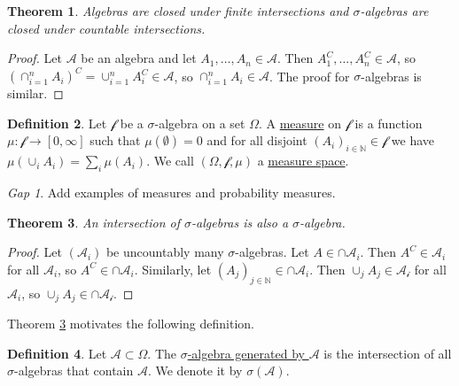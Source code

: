 \documentclass[11pt]{article}
\newcommand{\col}[1]{\mathscr{#1}}
\newcommand{\defname}[1]{\underline{#1}}
\newcommand{\NN}{\mathbb{N}}
\theoremstyle{theorem}
\newtheorem{theorem}{Theorem}[section]
\theoremstyle{definition}
\newtheorem{definition}[theorem]{Definition}
\theoremstyle{remark}
\theoremstyle{step}
\theoremstyle{gap}
\newtheorem*{gap}{Gap}
\begin{document}
\begin{theorem}
Algebras are closed under finite intersections and \(\sigma\)-algebras are closed under countable intersections.
\end{theorem}

\begin{proof}
Let \(\col{A}\) be an algebra and let \(A_1, \ldots, A_n \in \col{A}\). Then \(A_1^C, \ldots, A_n^C \in \col{A}\), so \(\left(\cap_{i=1}^n A_i\right)^C = \cup_{i=1}^n A_i^C \in \col{A}\), so \(\cap_{i=1}^n A_i \in \col{A}\). The proof for \(\sigma\)-algebras is similar.
\end{proof}

\begin{definition}
Let \(\col{f}\) be a \(\sigma\)-algebra on a set \(\Omega\). A \defname{measure} on \(\col{f}\) is a function \(\mu:\col{f} \to [0, \infty]\) such that \(\mu(\emptyset) = 0\) and for all disjoint \(\left(A_i\right)_{i\in \NN} \in \col{f}\) we have \(\mu\left(\cup_i A_i\right) = \sum_i \mu\left(A_i\right)\). We call \((\Omega, \col{f}, \mu)\) a \defname{measure space}.
\end{definition}

\begin{gap}
Add examples of measures and probability measures.
\end{gap}

\begin{theorem}\label{thm.intersection-algebras}
An intersection of \(\sigma\)-algebras is also a \(\sigma\)-algebra.
\end{theorem}

\begin{proof}
Let \((\col{A}_i)\) be uncountably many \(\sigma\)-algebras. Let \(A \in \cap \col{A}_i\). Then \(A^C \in \col{A}_i\) for all \(\col{A}_i\), so \(A^C \in \cap \col{A}_i\). Similarly, let \((A_j)_{j \in \NN} \in \cap \col{A}_i\). Then \(\cup_j A_j \in \col{A_i}\) for all \(\col{A}_i\), so \(\cup_j A_j \in \cap \col{A_i}\).
\end{proof}

Theorem \ref{thm.intersection-algebras} motivates the following definition.

\begin{definition}
Let \(\col{A} \subset \Omega\). The \defname{\(\sigma\)-algebra generated by \(\col{A}\)} is the intersection of all \(\sigma\)-algebras that contain \(\col{A}\). We denote it by \(\sigma(\col{A})\).
\end{definition}
\end{document}

